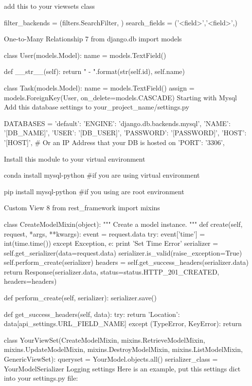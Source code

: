 add this to your viewsets class


filter_backends = (filters.SearchFilter, )
search_fields = ('<field>','<field>',)

One-to-Many Relationship 7
from django.db import models

class User(models.Model):
    name = models.TextField()

    def __str__(self):
        return "{} - {}".format(str(self.id), self.name)


class Task(models.Model):
    name = models.TextField()
    assign = models.ForeignKey(User, on_delete=models.CASCADE)
Starting with Mysql
Add this database settings to your_project_name/settings.py


DATABASES = {
    'default': {
        'ENGINE': 'django.db.backends.mysql',
        'NAME': '[DB_NAME]',
        'USER': '[DB_USER]',
        'PASSWORD': '[PASSWORD]',
        'HOST': '[HOST]',   # Or an IP Address that your DB is hosted on
        'PORT': '3306',
    }
}

Install this module to your virtual environment


conda install mysql-python #if you are using virtual environment

pip install mysql-python #if you using are root environment

Custom View 8
from rest_framework import mixins


class CreateModelMixin(object):
    """
    Create a model instance.
    """
    def create(self, request, *args, **kwargs):
        event = request.data
        try:
            event['time'] = int(time.time())
        except Exception, e:
            print 'Set Time Error'
        serializer = self.get_serializer(data=request.data)
        serializer.is_valid(raise_exception=True)
        self.perform_create(serializer)
        headers = self.get_success_headers(serializer.data)
        return Response(serializer.data, status=status.HTTP_201_CREATED, headers=headers)

    def perform_create(self, serializer):
        serializer.save()

    def get_success_headers(self, data):
        try:
            return {'Location': data[api_settings.URL_FIELD_NAME]}
        except (TypeError, KeyError):
            return {}

class YourViewSet(CreateModelMixin,
                  mixins.RetrieveModelMixin,
                  mixins.UpdateModelMixin,
                  mixins.DestroyModelMixin,
                  mixins.ListModelMixin,
                  GenericViewSet):
    queryset = YourModel.objects.all()
    serializer_class = YourModelSerializer
Logging settings
Here is an example, put this settings dict into your settings.py file:


